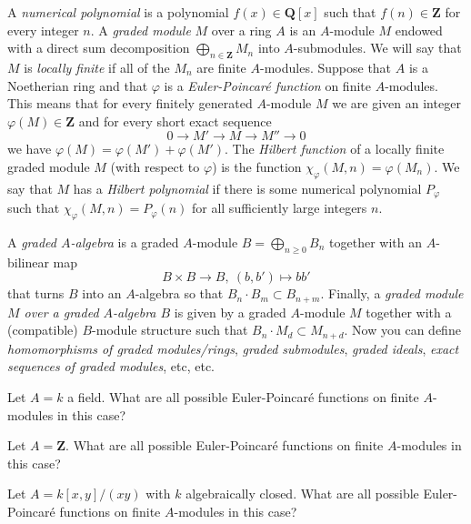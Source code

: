 \begin{definition}
A {\it numerical polynomial} is a polynomial $f(x) \in {\mathbf Q}[x]$
such that $f(n) \in {\mathbf Z}$ for every integer $n$.
A {\it graded module} $M$ over a ring $A$ is an $A$-module $M$
endowed with a direct sum decomposition
$
\bigoplus\nolimits_{n \in {\mathbf Z}} M_n
$
into $A$-submodules. We will say that $M$ is {\it locally finite} if all of
the $M_n$ are finite $A$-modules. Suppose that $A$ is a Noetherian ring and
that $\varphi$ is a {\it Euler-Poincar\'e function} on finite $A$-modules. 
This means that for every finitely generated $A$-module $M$ we are given an
integer $\varphi(M) \in {\mathbf Z}$ and for every short exact sequence 
$$
0
\longrightarrow
M'
\longrightarrow
M
\longrightarrow
M''
\longrightarrow
0
$$
we have $\varphi(M) = \varphi(M') + \varphi(M')$. The {\it Hilbert function}
of a locally finite graded module $M$ (with respect to $\varphi$) is the
function $\chi_\varphi(M,n) = \varphi(M_n)$. We say that $M$ has a
{\it Hilbert polynomial} if there is some numerical polynomial
$P_\varphi$ such that $\chi_\varphi(M,n) = P_\varphi(n)$ for all sufficiently
large integers $n$.
\end{definition}

\begin{definition}
A {\it graded $A$-algebra} is a graded $A$-module
$B = \bigoplus_{n \geq 0} B_n$ together with an $A$-bilinear map
$$
B \times B \longrightarrow B,\ (b,b') \longmapsto bb'
$$
that turns $B$ into an $A$-algebra so that $B_n \cdot B_m \subset B_{n+m}$.
Finally, a {\it graded module $M$ over a graded $A$-algebra $B$} is given
by a graded $A$-module $M$ together with a (compatible) $B$-module structure
such that $B_n \cdot M_d \subset M_{n+d}$. Now you can define {\it
homomorphisms of graded modules/rings}, {\it graded submodules}, {\it graded
ideals}, {\it exact sequences of graded modules}, etc, etc.
\end{definition}

\begin{exercise}
Let $A=k$ a field. What are all possible Euler-Poincar\'e functions
on finite $A$-modules in this case?
\end{exercise}

\begin{exercise}
Let $A ={\mathbf Z}$. What are all possible Euler-Poincar\'e functions
on finite $A$-modules in this case?
\end{exercise}

\begin{exercise}
Let $A = k[x,y]/(xy)$ with $k$ algebraically closed. What are all
possible Euler-Poincar\'e functions on finite $A$-modules in this case?
\end{exercise}

